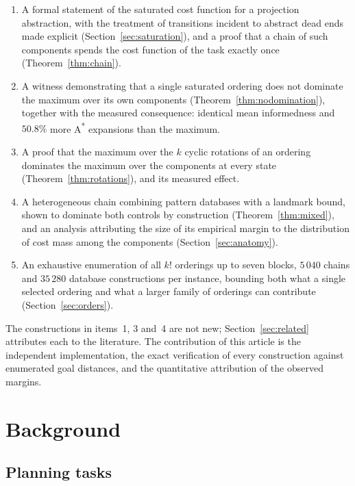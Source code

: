 \documentclass[10pt,twocolumn,a4paper]{article}
\theoremstyle{plain}
\theoremstyle{definition}
\theoremstyle{remark}
\begin{document}
\begin{enumerate}[itemsep=2pt,topsep=3pt,leftmargin=1.5em]
  \item A formal statement of the saturated cost function for a projection
        abstraction, with the treatment of transitions incident to abstract
        dead ends made explicit (Section~\ref{sec:saturation}), and a proof
        that a chain of such components spends the cost function of the task
        exactly once (Theorem~\ref{thm:chain}).
  \item A witness demonstrating that a single saturated ordering does not
        dominate the maximum over its own components
        (Theorem~\ref{thm:nodomination}), together with the measured
        consequence: identical mean informedness and $50.8\%$ more A\textsuperscript{*}
        expansions than the maximum.
  \item A proof that the maximum over the $k$ cyclic rotations of an ordering
        dominates the maximum over the components at every state
        (Theorem~\ref{thm:rotations}), and its measured effect.
  \item A heterogeneous chain combining pattern databases with a landmark
        bound, shown to dominate both controls by construction
        (Theorem~\ref{thm:mixed}), and an analysis attributing the size of its
        empirical margin to the distribution of cost mass among the components
        (Section~\ref{sec:anatomy}).
  \item An exhaustive enumeration of all $k!$ orderings up to seven blocks,
        $5\,040$ chains and $35\,280$ database constructions per instance,
        bounding both what a single selected ordering and what a larger family
        of orderings can contribute (Section~\ref{sec:orders}).
\end{enumerate}

The constructions in items~1, 3 and~4 are not new; Section~\ref{sec:related}
attributes each to the literature. The contribution of this article is the
independent implementation, the exact verification of every construction
against enumerated goal distances, and the quantitative attribution of the
observed margins.

\section{Background}
\label{sec:background}

\subsection{Planning tasks}
\end{document}
